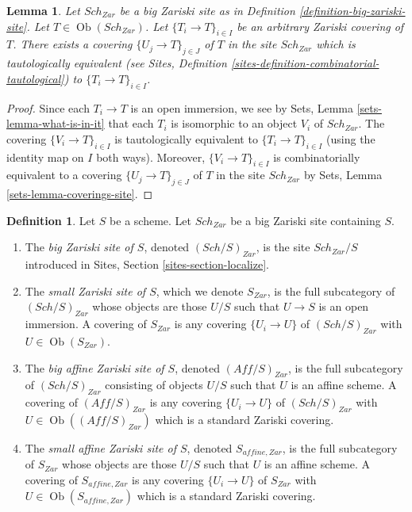 \documentclass{stacks-project}
\theoremstyle{plain}
\newtheorem{lemma}[subsection]{Lemma}
\theoremstyle{definition}
\newtheorem{definition}[subsection]{Definition}
\theoremstyle{remark}
\numberwithin{equation}{subsection}
\def\Sch{\mathit{Sch}}
\def\Ob{\mathop{\mathrm{Ob}}\nolimits}
\begin{document}
\begin{lemma}
\label{lemma-zariski-induced}
Let $\Sch_{Zar}$ be a big Zariski site as in
Definition \ref{definition-big-zariski-site}.
Let $T \in \Ob(\Sch_{Zar})$.
Let $\{T_i \to T\}_{i \in I}$ be an arbitrary Zariski covering of $T$.
There exists a covering $\{U_j \to T\}_{j \in J}$ of $T$ in the site
$\Sch_{Zar}$ which is tautologically equivalent (see
Sites, Definition \ref{sites-definition-combinatorial-tautological})
to $\{T_i \to T\}_{i \in I}$.
\end{lemma}

\begin{proof}
Since each $T_i \to T$ is an open immersion, we see by
Sets, Lemma \ref{sets-lemma-what-is-in-it}
that each $T_i$ is isomorphic to an object $V_i$ of $\Sch_{Zar}$.
The covering $\{V_i \to T\}_{i \in I}$ is tautologically equivalent
to $\{T_i \to T\}_{i \in I}$ (using the identity map on $I$ both ways).
Moreover, $\{V_i \to T\}_{i \in I}$ is combinatorially equivalent to a
covering $\{U_j \to T\}_{j \in J}$ of $T$ in the site $\Sch_{Zar}$ by
Sets, Lemma \ref{sets-lemma-coverings-site}.
\end{proof}

\begin{definition}
\label{definition-big-small-Zariski}
Let $S$ be a scheme. Let $\Sch_{Zar}$ be a big Zariski
site containing $S$.
\begin{enumerate}
\item The {\it big Zariski site of $S$}, denoted
$(\Sch/S)_{Zar}$, is the site $\Sch_{Zar}/S$
introduced in Sites, Section \ref{sites-section-localize}.
\item The {\it small Zariski site of $S$}, which we denote
$S_{Zar}$, is the full subcategory of $(\Sch/S)_{Zar}$
whose objects are those $U/S$ such that $U \to S$ is an open immersion.
A covering of $S_{Zar}$ is any covering $\{U_i \to U\}$ of
$(\Sch/S)_{Zar}$ with $U \in \Ob(S_{Zar})$.
\item The {\it big affine Zariski site of $S$}, denoted
$(\textit{Aff}/S)_{Zar}$, is the full subcategory of
$(\Sch/S)_{Zar}$ consisting of objects $U/S$ such that $U$ is an
affine scheme. A covering of $(\textit{Aff}/S)_{Zar}$ is any covering
$\{U_i \to U\}$ of $(\Sch/S)_{Zar}$ with $U \in \Ob((\textit{Aff}/S)_{Zar})$
which is a standard Zariski covering.
\item The {\it small affine Zariski site of $S$}, denoted
$S_{affine, Zar}$, is the full subcategory of $S_{Zar}$
whose objects are those $U/S$ such that $U$ is an affine scheme.
A covering of $S_{affine, Zar}$ is any covering $\{U_i \to U\}$ of
$S_{Zar}$ with $U \in \Ob(S_{affine, Zar})$
which is a standard Zariski covering.
\end{enumerate}
\end{definition}
\end{document}
